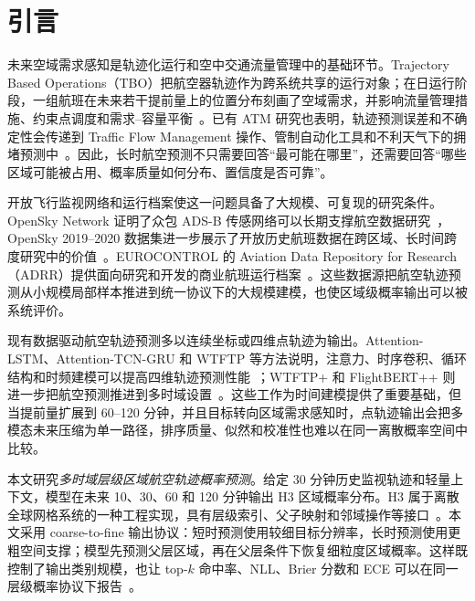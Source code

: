 \section{引言}

未来空域需求感知是轨迹化运行和空中交通流量管理中的基础环节。Trajectory Based Operations（TBO）把航空器轨迹作为跨系统共享的运行对象；在日运行阶段，一组航班在未来若干提前量上的位置分布刻画了空域需求，并影响流量管理措施、约束点调度和需求--容量平衡~\cite{faa_tbo_2026,icao_ganp_2026}。已有 ATM 研究也表明，轨迹预测误差和不确定性会传递到 Traffic Flow Management 操作、管制自动化工具和不利天气下的拥堵预测中~\cite{reisman2007trajectory_accuracy_tfm,mercer2013trajectory_uncertainty,chen2017atfm_uncertainty,nunezportillo2024congestion_weather}。因此，长时航空预测不只需要回答“最可能在哪里”，还需要回答“哪些区域可能被占用、概率质量如何分布、置信度是否可靠”。

开放飞行监视网络和运行档案使这一问题具备了大规模、可复现的研究条件。OpenSky Network 证明了众包 ADS-B 传感网络可以长期支撑航空数据研究~\cite{opensky2014}，OpenSky 2019--2020 数据集进一步展示了开放历史航班数据在跨区域、长时间跨度研究中的价值~\cite{strohmeier2021crowdsourced}。EUROCONTROL 的 Aviation Data Repository for Research（ADRR）提供面向研究和开发的商业航班运行档案~\cite{eurocontrol_adrr_2025}。这些数据源把航空轨迹预测从小规模局部样本推进到统一协议下的大规模建模，也使区域级概率输出可以被系统评价。

现有数据驱动航空轨迹预测多以连续坐标或四维点轨迹为输出。Attention-LSTM、Attention-TCN-GRU 和 WTFTP 等方法说明，注意力、时序卷积、循环结构和时频建模可以提高四维轨迹预测性能~\cite{jia2022attentionlstm,ma2024attentiontcngru,zhang2023wtftp}；WTFTP+ 和 FlightBERT++ 则进一步把航空预测推进到多时域设置~\cite{guo2026wtftpplus,guo_flightbertpp_2024}。这些工作为时间建模提供了重要基础，但当提前量扩展到 60--120 分钟，并且目标转向区域需求感知时，点轨迹输出会把多模态未来压缩为单一路径，排序质量、似然和校准性也难以在同一离散概率空间中比较。

本文研究\emph{多时域层级区域航空轨迹概率预测}。给定 30 分钟历史监视轨迹和轻量上下文，模型在未来 10、30、60 和 120 分钟输出 H3 区域概率分布。H3 属于离散全球网格系统的一种工程实现，具有层级索引、父子映射和邻域操作等接口~\cite{sahr2003gdggs,h3docs2025}。本文采用 coarse-to-fine 输出协议：短时预测使用较细目标分辨率，长时预测使用更粗空间支撑；模型先预测父层区域，再在父层条件下恢复细粒度区域概率。这样既控制了输出类别规模，也让 top-$k$ 命中率、NLL、Brier 分数和 ECE 可以在同一层级概率协议下报告~\cite{gneiting2007strictlyproper,brier1950verification,guo2017calibration}。

